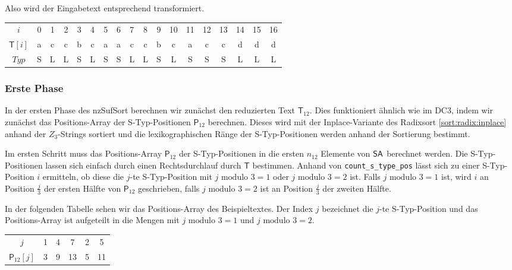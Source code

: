 Also wird der Eingabetext entsprechend transformiert.

\begin{table}[H]
	\footnotesize
	\centering
	\begin{tabular}{c| c c c c c c c c c c c c c c c c c}
		$i$ & 0 & 1 & 2 & 3 & 4 & 5 & 6 & 7 & 8 & 9 & 10 & 11 & 12 & 13 & 14 & 15 & 16 \\
		$\mathsf{T}[i]$ & a & c & c & b & c & a & a & c & c & b & c & a & c & c & d & d & d \\
		$Typ$ & S & L & L & S & L & S & S & L & L & S & L & S & S & S & L & L & L
	\end{tabular}
\end{table}

\subsubsection{Erste Phase}

In der ersten Phase des nzSufSort berechnen wir zunächst den reduzierten Text $\mathsf{T}_{12}$. Dies funktioniert ähnlich wie im DC3, indem wir zunächst das Positions-Array der S-Typ-Positionen $\mathsf{P}_{12}$ berechnen. Dieses wird mit der Inplace-Variante des Radixsort \cref{sort:radix:inplace} anhand der $Z_3$-Strings sortiert und die lexikographischen Ränge der S-Typ-Positionen werden anhand der Sortierung bestimmt. \par

Im ersten Schritt muss das Positions-Array $\mathsf{P}_{12}$ der S-Typ-Positionen in die ersten $n_{12}$ Elemente von $\sa$ berechnet werden. Die S-Typ-Positionen lassen sich einfach durch einen Rechtsdurchlauf durch $\mathsf{T}$ bestimmen. Anhand von  \texttt{count\_s\_type\_pos} lässt sich zu einer S-Typ-Position $i$ ermitteln, ob diese die $j$-te S-Typ-Position mit $j \text{ modulo } 3 = 1$ oder $j \text{ modulo } 3 = 2$ ist. Falls $j \text{ modulo } 3 = 1$ ist, wird $i$ an Position $\frac{j}{3}$ der ersten Hälfte von $\mathsf{P}_{12}$ geschrieben, falls $j \text{ modulo } 3 = 2$ ist an Position $\frac{j}{3}$ der zweiten Hälfte. \par
In der folgenden Tabelle sehen wir das Positions-Array des Beispieltextes. Der Index $j$ bezeichnet die $j$-te S-Typ-Position und das Positions-Array ist aufgeteilt in die Mengen mit $j \text{ modulo } 3 = 1$ und $j \text{ modulo } 3 = 2$.

\begin{table}[H]
	\footnotesize
	\centering
	\begin{tabular}{c| c c c || c c }
		$j$ & 1 & 4 & 7 & 2 & 5 \\
		$\mathsf{P}_{12}[j]$ & 3 & 9 & 13 & 5 & 11 
	\end{tabular}
\end{table}

